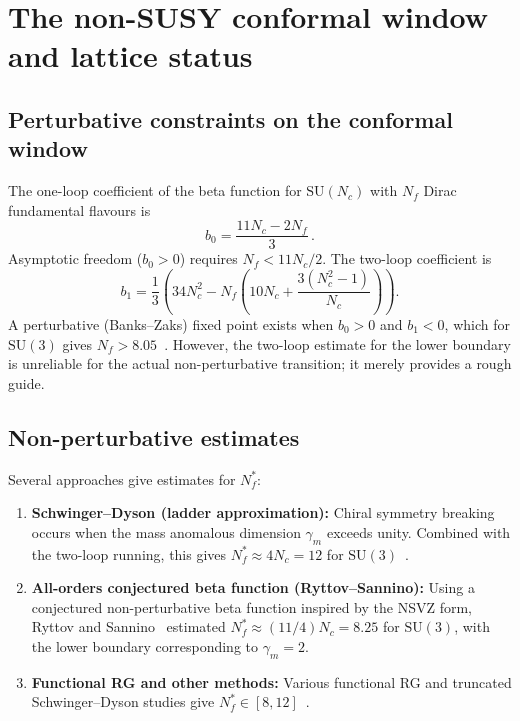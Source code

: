 \documentclass[11pt,a4paper]{article}
\theoremstyle{plain}
\theoremstyle{definition}
\theoremstyle{remark}
\newcommand{\Nc}{N_{\!c}}
\newcommand{\Nf}{N_{\!f}}
\newcommand{\Nfstar}{\Nf^*}
\newcommand{\SU}[1]{\mathrm{SU}(#1)}
\begin{document}
\section{The non-SUSY conformal window and lattice status}
\label{sec:review}

\subsection{Perturbative constraints on the conformal window}

The one-loop coefficient of the beta function for $\SU{\Nc}$ with
$\Nf$ Dirac fundamental flavours is
\begin{equation}\label{eq:b0}
  b_0 = \frac{11\Nc - 2\Nf}{3}\,.
\end{equation}
Asymptotic freedom ($b_0 > 0$) requires $\Nf < 11\Nc/2$.  The
two-loop coefficient is
\begin{equation}\label{eq:b1}
  b_1 = \frac{1}{3}\left(
    34\Nc^2 - \Nf\left(10\Nc + \frac{3(\Nc^2 - 1)}{\Nc}\right)
  \right).
\end{equation}
A perturbative (Banks--Zaks) fixed point exists when $b_0 > 0$ and
$b_1 < 0$, which for $\SU{3}$ gives $\Nf > 8.05$~\cite{BZ1982}.
However, the two-loop estimate for the lower boundary is unreliable
for the actual non-perturbative transition; it merely provides a rough
guide.

\subsection{Non-perturbative estimates}

Several approaches give estimates for $\Nfstar$:

\begin{enumerate}[label=(\roman*)]
  \item \textbf{Schwinger--Dyson (ladder approximation):}
    Chiral symmetry breaking occurs when the mass anomalous dimension
    $\gamma_m$ exceeds unity.  Combined with the two-loop running, this
    gives $\Nfstar \approx 4\Nc = 12$ for $\SU{3}$~\cite{Appelquist1988,
    Cohen1989}.

  \item \textbf{All-orders conjectured beta function
    (Ryttov--Sannino):}  Using a conjectured non-perturbative beta
    function inspired by the NSVZ form, Ryttov and
    Sannino~\cite{RS2008} estimated $\Nfstar \approx (11/4)\Nc = 8.25$
    for $\SU{3}$, with the lower boundary corresponding to
    $\gamma_m = 2$.

  \item \textbf{Functional RG and other methods:}  Various functional
    RG and truncated Schwinger--Dyson studies give
    $\Nfstar \in [8, 12]$~\cite{Gies2006,Braun2010}.
\end{enumerate}
\end{document}
